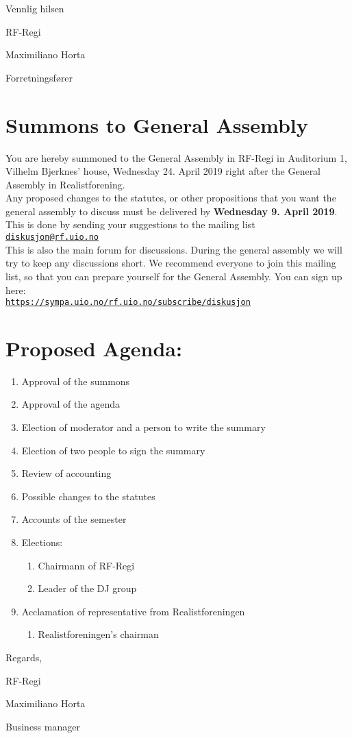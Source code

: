 \documentclass[a4paper]{article}
\begin{document}
\vspace{2.5cm}

Vennlig hilsen

RF-Regi

Maximiliano Horta

Forretningsfører

\newpage

\section*{\textsf{\textbf{\huge Summons to General Assembly}}}
\vspace{1cm}

You are hereby summoned to the General Assembly in RF-Regi in Auditorium 1,
Vilhelm Bjerknes' house, Wednesday 24. April 2019 right after
the General Assembly in Realistforening. \\


Any proposed changes to the statutes, or other propositions that you want the general
assembly to discuss must be delivered by \textbf{Wednesday 9. April 2019}.
This is done by sending your suggestions to the mailing list \linebreak
\href{mailto:diskusjon@rf.uio.no}{\texttt{diskusjon@rf.uio.no}} \\


This is also the main forum for discussions. During the general assembly we will try to keep
any discussions short. We recommend everyone to join this mailing list, so that you can
prepare yourself for the General Assembly. You can sign up here: \\
\texttt{\url{https://sympa.uio.no/rf.uio.no/subscribe/diskusjon}}\\

\section*{\textsf{Proposed Agenda:}}
\begin{enumerate}
    \item Approval of the summons
    \item Approval of the agenda
    \item Election of moderator and a person to write the summary
    \item Election of two people to sign the summary
    \item Review of accounting
    \item Possible changes to the statutes
    \item Accounts of the semester
    \item Elections:
    \begin{enumerate}
        \item Chairmann of RF-Regi
        \item Leader of the DJ group
    \end{enumerate}
    \item Acclamation of representative from Realistforeningen
    \begin{enumerate}
        \item Realistforeningen's chairman
    \end{enumerate}
\end{enumerate}

\vspace{2cm}
Regards,

RF-Regi

Maximiliano Horta

Business manager
\end{document}
